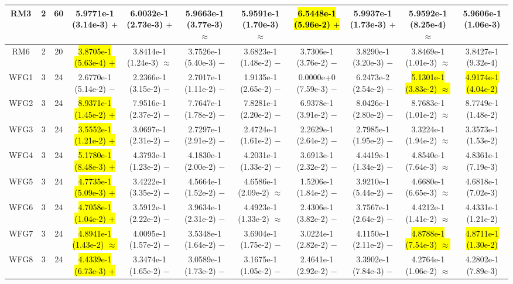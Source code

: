 \documentclass[journal]{IEEEtran}
\begin{document}
\begin{table*}[htbp]
\begin{tabular}{ccccccccccc}
\hline
\multirow{1}{*}{RM3}&2&60&5.9771e-1 (3.14e-3) $+$&6.0032e-1 (2.73e-3) $+$&5.9663e-1 (3.77e-3) $\approx$&5.9591e-1 (1.70e-3) $\approx$&\hl{6.5448e-1 (5.96e-2) $+$}&5.9937e-1 (1.73e-3) $+$&5.9592e-1 (8.25e-4) $\approx$&5.9606e-1 (1.06e-3)\\
\hline
\multirow{1}{*}{RM6}&2&20&\hl{3.8705e-1 (5.63e-4) $+$}&3.8414e-1 (1.24e-3) $\approx$&3.7526e-1 (5.40e-3) $-$&3.6823e-1 (1.48e-2) $-$&3.7306e-1 (3.76e-2) $-$&3.8290e-1 (3.20e-3) $-$&3.8469e-1 (1.01e-3) $\approx$&3.8427e-1 (9.32e-4)\\
\hline
\multirow{1}{*}{WFG1}&3&24&2.6770e-1 (5.14e-2) $-$&2.2366e-1 (3.15e-2) $-$&2.7017e-1 (1.11e-2) $-$&1.9135e-1 (2.65e-2) $-$&0.0000e+0 (7.59e-3) $-$&6.2473e-2 (2.54e-2) $-$&\hl{5.1301e-1 (3.83e-2) $\approx$}&\hl{4.9174e-1 (4.04e-2)}\\
\hline
\multirow{1}{*}{WFG2}&3&24&\hl{8.9371e-1 (1.45e-2) $+$}&7.9516e-1 (2.37e-2) $-$&7.7647e-1 (1.78e-2) $-$&7.8281e-1 (2.20e-2) $-$&6.9378e-1 (3.91e-2) $-$&8.0426e-1 (2.80e-2) $-$&8.7683e-1 (1.01e-2) $\approx$&8.7749e-1 (1.48e-2)\\
\hline
\multirow{1}{*}{WFG3}&3&24&\hl{3.5552e-1 (1.21e-2) $+$}&3.0697e-1 (2.31e-2) $-$&2.7297e-1 (2.91e-2) $-$&2.4724e-1 (1.61e-2) $-$&2.2629e-1 (2.64e-2) $-$&2.7985e-1 (1.95e-2) $-$&3.3224e-1 (1.94e-2) $\approx$&3.3573e-1 (1.53e-2)\\
\hline
\multirow{1}{*}{WFG4}&3&24&\hl{5.1780e-1 (8.48e-3) $+$}&4.3793e-1 (1.23e-2) $-$&4.1830e-1 (2.00e-2) $-$&4.2031e-1 (1.33e-2) $-$&3.6913e-1 (2.32e-2) $-$&4.4419e-1 (1.34e-2) $-$&4.8540e-1 (7.64e-3) $\approx$&4.8361e-1 (7.19e-3)\\
\hline
\multirow{1}{*}{WFG5}&3&24&\hl{4.7735e-1 (5.09e-3) $+$}&3.4222e-1 (3.35e-2) $-$&4.5664e-1 (1.52e-2) $-$&4.6586e-1 (2.09e-2) $\approx$&1.5206e-1 (1.84e-2) $-$&3.9210e-1 (5.44e-2) $-$&4.6680e-1 (6.65e-3) $\approx$&4.6818e-1 (7.02e-3)\\
\hline
\multirow{1}{*}{WFG6}&3&24&\hl{4.7058e-1 (1.04e-2) $+$}&3.5912e-1 (2.22e-2) $-$&3.9634e-1 (2.31e-2) $-$&4.4923e-1 (1.33e-2) $\approx$&2.4306e-1 (3.82e-2) $-$&3.7567e-1 (2.64e-2) $-$&4.4212e-1 (1.41e-2) $\approx$&4.4331e-1 (1.21e-2)\\
\hline
\multirow{1}{*}{WFG7}&3&24&\hl{4.8941e-1 (1.43e-2) $\approx$}&4.0095e-1 (1.57e-2) $-$&3.5348e-1 (1.64e-2) $-$&3.6904e-1 (1.75e-2) $-$&3.0224e-1 (2.82e-2) $-$&4.1150e-1 (2.11e-2) $-$&\hl{4.8788e-1 (7.54e-3) $\approx$}&\hl{4.8711e-1 (1.30e-2)}\\
\hline
\multirow{1}{*}{WFG8}&3&24&\hl{4.4339e-1 (6.73e-3) $+$}&3.3474e-1 (1.65e-2) $-$&3.0589e-1 (1.73e-2) $-$&3.1675e-1 (1.05e-2) $-$&2.4641e-1 (2.92e-2) $-$&3.3902e-1 (7.84e-3) $-$&4.2764e-1 (1.06e-2) $\approx$&4.2802e-1 (7.89e-3)\\

\end{tabular}
\end{table*}
\end{document}
